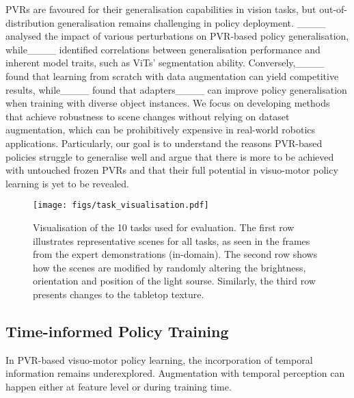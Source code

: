 PVRs are favoured for their generalisation capabilities in vision tasks, but out-of-distribution generalisation remains challenging in policy deployment. 
____ analysed the impact of various perturbations on PVR-based policy generalisation, while____ identified correlations between generalisation performance and inherent model traits, such as ViTs' segmentation ability.
Conversely,____ found that learning from scratch with data augmentation can yield competitive results, while____ found that adapters____ can improve policy generalisation when training with diverse object instances. 
We focus on developing methods that achieve robustness to scene changes without relying on dataset augmentation, which can be prohibitively expensive in real-world robotics applications.
Particularly, our goal is to understand the reasons PVR-based policies struggle to generalise well and argue that there is more to be achieved with untouched frozen PVRs and that their full potential in visuo-motor policy learning is yet to be revealed. 
\begin{figure*}[t]
\begin{center}
\texttt{[image: figs/task\_visualisation.pdf]} \\
\vspace{-10pt}
\caption{Visualisation of the 10 tasks used for evaluation. The first row illustrates representative scenes for all tasks, as seen in the frames from the expert demonstrations (in-domain). The second row shows how the scenes are modified by randomly altering the brightness, orientation and position of the light sourse. Similarly, the third row presents changes to the tabletop texture.}
\label{fig:task_vis}
\end{center}
\vspace{-15pt}
\end{figure*}

\subsection{Time-informed Policy Training} 
In PVR-based visuo-motor policy learning, the incorporation of temporal information remains underexplored. Augmentation with temporal perception can happen either at feature level or during training time. 

